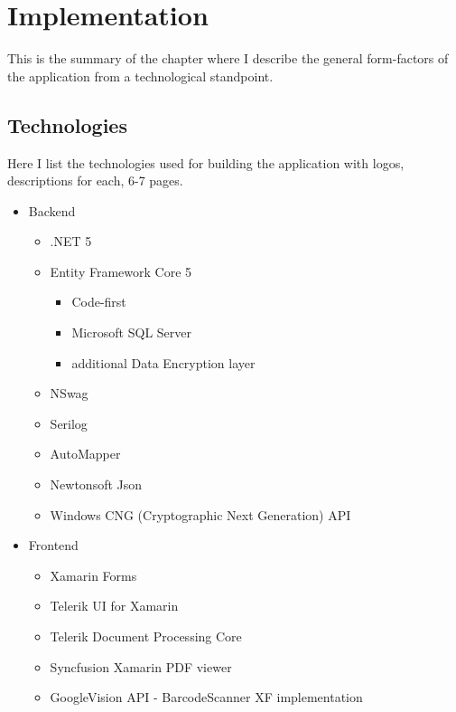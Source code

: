 \chapter{Implementation}\label{ch:IMPLEMENTATION}

\begin{summary}
	This is the summary of the chapter where I describe the general form-factors of the application from a technological standpoint.
\end{summary}

\section{Technologies}
Here I list the technologies used for building the application with logos, descriptions for each, 6-7 pages.

\begin{itemize}
	\item Backend
	\begin{itemize}
		\item .NET 5
		\item Entity Framework Core 5
		\begin{itemize}
			\item Code-first
			\item Microsoft SQL Server
			\item additional Data Encryption layer
		\end{itemize}
		\item NSwag
		\item Serilog
		\item AutoMapper
		\item Newtonsoft Json
		\item Windows CNG (Cryptographic Next Generation) API
	\end{itemize}
	\item Frontend
	\begin{itemize}
		\item Xamarin Forms
		\item Telerik UI for Xamarin
		\item Telerik Document Processing Core
		\item Syncfusion Xamarin PDF viewer
		\item GoogleVision API - BarcodeScanner XF implementation
	\end{itemize}
\end{itemize}


